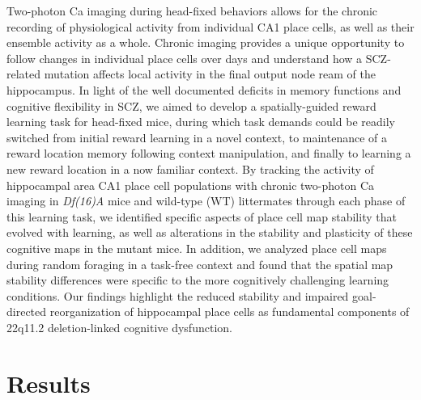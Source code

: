 Two-photon Ca imaging during head-fixed behaviors \citep{Danielson2016b}\citep{Dombeck2010} allows for the chronic recording of physiological activity from individual CA1 place cells, as well as their ensemble activity as a whole. Chronic imaging provides a unique opportunity to follow changes in individual place cells over days and understand how a SCZ-related mutation affects local activity in the final output node ream of the hippocampus. In light of the well documented deficits in memory functions and cognitive flexibility in SCZ, we aimed to develop a spatially-guided reward learning task for head-fixed mice, during which task demands could be readily switched from initial reward learning in a novel context, to maintenance of a reward location memory following context manipulation, and finally to learning a new reward location in a now familiar context. By tracking the activity of hippocampal area CA1 place cell populations with chronic two-photon Ca imaging in \emph{Df(16)A\super{+/-}} mice and wild-type (WT) littermates through each phase of this learning task, we identified specific aspects of place cell map stability that evolved with learning, as well as alterations in the stability and plasticity of these cognitive maps in the mutant mice. In addition, we analyzed place cell maps during random foraging in a task-free context and found that the spatial map stability differences were specific to the more cognitively challenging learning conditions. Our findings highlight the reduced stability and impaired goal-directed reorganization of hippocampal place cells as fundamental components of 22q11.2 deletion-linked cognitive dysfunction.  

\section{Results}

